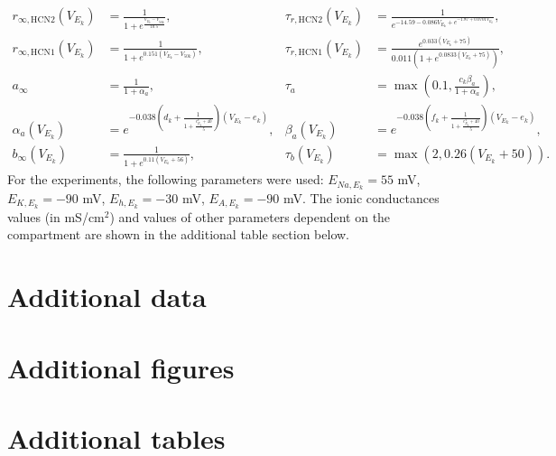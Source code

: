 \begin{align*}
    r_{\infty,\text{HCN2}}(V_{E_k}) & = \frac{1}{1 + e^{\frac{V_{E_k} - V_{50k}}{10.5}}},                                         & \tau_{r,\text{HCN2}}(V_{E_k}) & = \frac{1}{e^{-14.59 - 0.086V_{E_k} + e^{-1.87 + 0.0701V_{E_k}}}},                          \\
    r_{\infty,\text{HCN1}}(V_{E_k}) & = \frac{1}{1 + e^{0.151(V_{E_k}-V_{50k})}},                                                 & \tau_{r,\text{HCN1}}(V_{E_k}) & = \frac{e^{0.033(V_{E_k} + 75)}}{0.011 \left( 1 + e^{0.0833(V_{E_k}+75)} \right)},          \\
    a_{\infty}                      & = \frac{1}{1 + \alpha_a},                                                                   & \tau_a                        & = \max \left( 0.1, \frac{c_k \beta_a}{1 + \alpha_a} \right),                                \\
    \alpha_a(V_{E_k})               & = e^{-0.038 \left( d_k + \frac{1}{1 + {\frac{e^V_{E_k} + 40}{5}}} \right) (V_{E_k} - e_k)}, & \beta_a(V_{E_k})              & = e^{-0.038 \left( f_k + \frac{1}{1 + {\frac{e^V_{E_k} + 40}{5}}} \right) (V_{E_k} - e_k)}, \\
    b_{\infty}(V_{E_k})             & = \frac{1}{1 + e^{0.11(V_{E_k} + 56)}},                                                     & \tau_b(V_{E_k})               & = \max \left( 2, 0.26(V_{E_k} + 50) \right).
\end{align*}
For the experiments, the following parameters were used:
\(E_{Na,E_k} = 55\) mV, \(E_{K,E_k} = -90\) mV, \(E_{h,E_k} = -30\) mV, \(E_{A,E_k} = -90\) mV.
The ionic conductances values (in mS/cm\(^2\)) and values of other parameters dependent on the compartment are shown in the additional table section below.\pagebreak

\section{Additional data}

\section{Additional figures}

\section{Additional tables}


